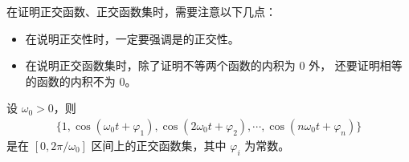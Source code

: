 \begin{note}
    在证明正交函数、正交函数集时，需要注意以下几点：
    \begin{itemize}
        \item 在说明正交性时，一定要强调是的正交性。
        \item 在说明正交函数集时，除了证明不等两个函数的内积为 $0$ 外，
            还要证明相等的函数的内积不为 $0$。
    \end{itemize}
\end{note}

\begin{example}
    设 $\omega_0 > 0$，则
    \begin{align*}
        \{1, \cos(\omega_0t + \varphi_1), \cos(2\omega_0t + \varphi_2),
            \cdots, \cos(n\omega_0 t + \varphi_n)\}
    \end{align*}
    是在 $[0, 2\pi/\omega_0]$ 区间上的正交函数集，其中 $\varphi_i$ 为常数。
\end{example}

